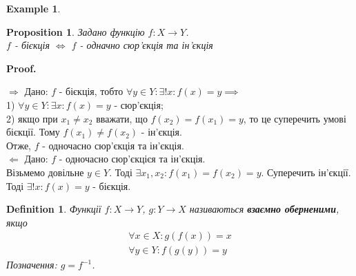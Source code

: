 \documentclass[a4paper, 14pt]{article}
\makeatletter
\def\qed{$\blacksquare$}
\def\rightproof{$\boxed{\Rightarrow}$ }
\def\leftproof{$\boxed{\Leftarrow}$ }
\theoremstyle{theoremdd}
\theoremstyle{theoremdd}
\newtheorem{definition}[theorem]{Definition}
\theoremstyle{theoremdd}
\theoremstyle{theoremdd}
\newtheorem{example}[theorem]{Example}
\theoremstyle{theoremdd}
\newtheorem{proposition}[theorem]{Proposition}
\theoremstyle{theoremdd}
\theoremstyle{theoremdd}
\theoremstyle{theoremdd}
\renewenvironment{proof}[1][Proof.\\]{\par
\pushQED{\hfill \qed}%
\normalfont \topsep6\p@\@plus6\p@\relax
\trivlist
\item\relax
{\bfseries
#1\@addpunct{.}}\hspace\labelsep\ignorespaces
}{%
\popQED\endtrivlist\@endpefalse
}
\makeatother
\begin{document}
\begin{example}
\begin{figure}[H]
{
}
\end{figure}
\end{example}
	
	\begin{proposition}
	Задано функцію $f: X \to Y$. \\
	$f$ - бієкція $\iff$ $f$ - одначно сюр'єкція та ін'єкція
	\end{proposition}
	
	\begin{proof}
	\rightproof Дано: $f$ - бієкція, тобто $\forall y \in Y: \exists! x: f(x) = y \implies $\\
	1) $\forall y \in Y: \exists x: f(x) = y$ - сюр'єкція;\\
	2) якщо при $x_1 \neq x_2$ вважати, що $f(x_2) = f(x_1) = y$, то це суперечить умові бієкції. Тому $f(x_1) \neq f(x_2)$ - ін'єкція.\\
	Отже, $f$ - одночасно сюр'єкція та ін'єкція.
	\bigskip \\
	
	\leftproof Дано: $f$ - одночасно сюр'єкцієя та ін'єкція.\\
	Візьмемо довільне $y \in Y$. Тоді $\exists x_1, x_2: f(x_1) = f(x_2) = y$. Суперечить ін'єкції.\\ 
	Тоді $\exists! x: f(x) = y$ - бієкція.
	\end{proof}
	
	\begin{definition}
	Функції $f: X \to Y$, $g: Y \to X$ називаються \textbf{взаємно оберненими}, якщо
	\begin{align*}
	\forall x \in X: g(f(x)) = x \\
	\forall y \in Y: f(g(y)) = y
	\end{align*}
	Позначення: $g = f^{-1}$.
\begin{figure}[H]
\end{figure}
	\end{definition}
	
\end{document}
